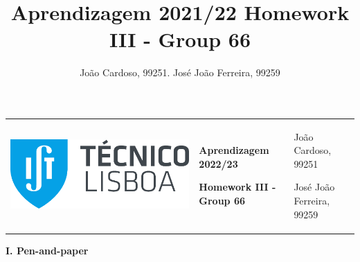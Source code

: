\documentclass[11pt,a4paper]{article}
\title{Aprendizagem 2021/22 Homework III - Group 66}
\author{João Cardoso, 99251. José João Ferreira, 99259}
\begin{document}
\color{darkgray}
\hspace{-8.25mm}
\renewcommand\tabularxcolumn[1]{m{#1}}
\begin{tabularx}{1.09\textwidth} {>{\raggedright\arraybackslash}X >{\centering\arraybackslash}X >{\raggedleft\arraybackslash}X}
  \includegraphics[scale=0.2]{tecnico.pdf}                            &
  \textbf{Aprendizagem 2022/23} \par \textbf{Homework III - Group 66} &
  João Cardoso, 99251 \par José João Ferreira, 99259
\end{tabularx}
\renewcommand\tabularxcolumn[1]{p{#1}}
\color{black}

\begin{center}
  \textbf{I. Pen-and-paper}
\end{center}
\end{document}
